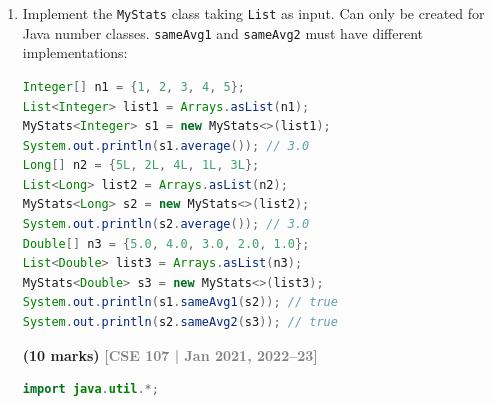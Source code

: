 \documentclass[12pt,a3paper]{article}
\newcommand{\yr}[1]{\hfill\textcolor{gray}{\small\textbf{[#1]}}}
\newcommand{\mk}[1]{\textcolor{orange!70!black}{\small\textbf{(#1 marks)}}}
\begin{document}
\begin{enumerate}
\begin{tcolorbox}
\begin{lstlisting}[language=Java]
class Queue<T extends Number> implements iQueue<T> {
    private LinkedList<T> list = new LinkedList<>();

    @Override
    public void enqueue(T item) { list.addLast(item); }

    @Override
    public T dequeue() {
        if (isEmpty())
            throw new RuntimeException("Queue is empty");
        return list.removeFirst();
    }

    @Override
    public boolean isEmpty() { return list.isEmpty(); }

    @Override
    public String toString() { return list.toString(); }
}

class QueueDemo {
    public static void main(String[] args) {
        Queue<Integer> q = new Queue<>();
        q.enqueue(10); q.enqueue(20); q.enqueue(30);
        System.out.println("Queue: " + q);
        System.out.println("Dequeue: " + q.dequeue());
        System.out.println("Queue: " + q);

        Queue<Double> dq = new Queue<>();
        dq.enqueue(1.5); dq.enqueue(2.5);
        System.out.println("Double Queue: " + dq);
    }
}
\end{lstlisting}
\textbf{Output:}
\begin{verbatim}
Queue: [10, 20, 30]
Dequeue: 10
Queue: [20, 30]
Double Queue: [1.5, 2.5]
\end{verbatim}
\end{tcolorbox}




\item Implement the \texttt{MyStats} class taking \texttt{List} as input. Can only be created for Java number classes. \texttt{sameAvg1} and \texttt{sameAvg2} must have different implementations:
\begin{lstlisting}[language=Java]
Integer[] n1 = {1, 2, 3, 4, 5};
List<Integer> list1 = Arrays.asList(n1);
MyStats<Integer> s1 = new MyStats<>(list1);
System.out.println(s1.average()); // 3.0
Long[] n2 = {5L, 2L, 4L, 1L, 3L};
List<Long> list2 = Arrays.asList(n2);
MyStats<Long> s2 = new MyStats<>(list2);
System.out.println(s2.average()); // 3.0
Double[] n3 = {5.0, 4.0, 3.0, 2.0, 1.0};
List<Double> list3 = Arrays.asList(n3);
MyStats<Double> s3 = new MyStats<>(list3);
System.out.println(s1.sameAvg1(s2)); // true
System.out.println(s2.sameAvg2(s3)); // true
\end{lstlisting}
\mk{10}
\yr{CSE 107 | Jan 2021, 2022--23}

\begin{tcolorbox}[enhanced,breakable,ansbox,
  colback=cG!4,colframe=cG,boxrule=0.8pt,arc=5pt,
  title={\textbf{Answer --- MyStats Taking List as Input}},
  fonttitle=\bfseries\color{white},colbacktitle=cG]
\begin{lstlisting}[language=Java]
import java.util.*;


\end{lstlisting}
\end{tcolorbox}
\end{enumerate}
\end{document}
